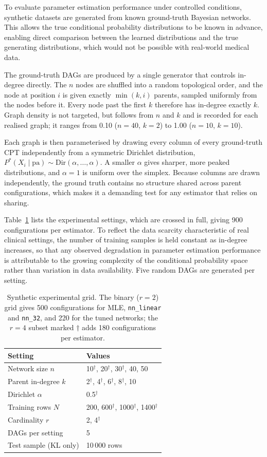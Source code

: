 \documentclass[a4paper,fleqn]{cas-dc}
\begin{document}
To evaluate parameter estimation performance under controlled conditions, synthetic datasets are generated from known ground-truth Bayesian networks. This allows the true conditional probability distributions to be known in advance, enabling direct comparison between the learned distributions and the true generating distributions, which would not be possible with real-world medical data.

The ground-truth DAGs are produced by a single generator that controls in-degree directly. The $n$ nodes are shuffled into a random topological order, and the node at position $i$ is given exactly $\min(k,i)$ parents, sampled uniformly from the nodes before it. Every node past the first $k$ therefore has in-degree exactly $k$. Graph density is not targeted, but follows from $n$ and $k$ and is recorded for each realised graph; it ranges from 0.10 ($n=40$, $k=2$) to 1.00 ($n=10$, $k=10$).

Each graph is then parameterised by drawing every column of every ground-truth CPT independently from a symmetric Dirichlet distribution, $P^*(X_i\mid \mathrm{pa}) \sim \mathrm{Dir}(\alpha,\dots,\alpha)$. A smaller $\alpha$ gives sharper, more peaked distributions, and $\alpha = 1$ is uniform over the simplex. Because columns are drawn independently, the ground truth contains no structure shared across parent configurations, which makes it a demanding test for any estimator that relies on sharing.

Table~\ref{tab:grid} lists the experimental settings, which are crossed in full, giving 900 configurations per estimator. To reflect the data scarcity characteristic of real clinical settings, the number of training samples is held constant as in-degree increases, so that any observed degradation in parameter estimation performance is attributable to the growing complexity of the conditional probability space rather than variation in data availability. Five random DAGs are generated per setting.

\begin{table}[tbp]
\caption{Synthetic experimental grid. The binary ($r{=}2$) grid gives 500 configurations for MLE, \texttt{nn\_linear} and \texttt{nn\_32}, and 220 for the tuned networks; the $r{=}4$ subset marked $\dagger$ adds 180 configurations per estimator.}\label{tab:grid}
\begin{tabular*}{\tblwidth}{@{\extracolsep{\fill}}ll@{}}
\toprule
Setting & Values \\
\midrule
Network size $n$ & 10$^\dagger$, 20$^\dagger$, 30$^\dagger$, 40, 50 \\
Parent in-degree $k$ & 2$^\dagger$, 4$^\dagger$, 6$^\dagger$, 8$^\dagger$, 10 \\
Dirichlet $\alpha$ & 0.5$^\dagger$ \\
Training rows $N$ & 200, 600$^\dagger$, 1000$^\dagger$, 1400$^\dagger$ \\
Cardinality $r$ & 2, 4$^\dagger$ \\
DAGs per setting & 5 \\
Test sample (KL only) & 10\,000 rows \\
\bottomrule
\end{tabular*}
\end{table}
\end{document}
